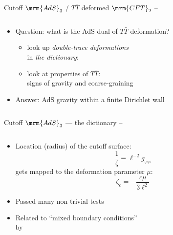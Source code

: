 \documentclass[
	10pt
	,handout
	,noamsthm
]{beamer}
\newcommand{\TTbar}{\texorpdfstring{\ensuremath{T\bar{T}}}{TTbar}\xspace}
\begin{document}
\begin{frame}{Cutoff $\mrm{AdS}_3$ / \TTbar deformed $\mrm{CFT}_2$}{%
	\textcite{McGough:2016lol} --
}
\begin{columns}
\figCutoffAds
\hspace{-2em}
\begin{column}{.75\textwidth}
	\begin{itemize}
	\item Question: what is the AdS dual of \TTbar deformation?\\
	
	\begin{itemize}
	\item look up \textit{double-trace deformations}\\
	in \textit{the dictionary}:\\
	\textcite{Heemskerk:2010hk}
	
\pause
	\item look at properties of \TTbar:\\
	signs of gravity and coarse-graining\\
	\textcite{Dubovsky:2012wk,Dubovsky:2013ira}
	\end{itemize}
	
	\pause
	\item Answer: AdS gravity within a finite Dirichlet wall
	
	\end{itemize}
\end{column}
\end{columns}
\end{frame}


\begin{frame}{Cutoff $\mrm{AdS}_3$ --- the dictionary}{%
	\textcite{McGough:2016lol} --
}
\begin{columns}
\figCutoffAds
\hspace{-1em}
\begin{column}{.7\textwidth}
	\begin{itemize}
	\item Location (radius) of the cutoff surface:
	\begin{equation}
		\frac{1}{\zeta} \equiv \ell^{-2} g_{\varphi\varphi} \label{cutoff}
	\end{equation}
	gets mapped to the deformation parameter $\mu$:
	\begin{equation}
		\zeta_c = - \frac{c \mu}{3\ell^2}
		\label{dictionary}
	\end{equation}
	
\pause
	
	\item Passed many non-trivial tests
	\item Related to ``mixed boundary conditions''\\
	by \textcite{Guica:2019nzm}
	
	\end{itemize}
\end{column}
\end{columns}
\end{frame}
\end{document}
